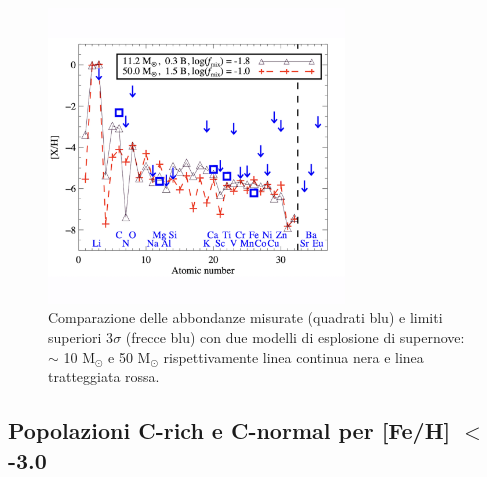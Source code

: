 \documentclass[12pt]{article}
\begin{document}
  \
\begin{figure}[!tbp]
\centering

    \includegraphics[width=0.7\textwidth]{nordlander2}
    \caption{Comparazione delle abbondanze misurate (quadrati blu) e limiti superiori 3$\sigma$ (frecce blu) con due modelli di esplosione di supernove: $\sim$ 10 M$_{\odot}$ e 50 M$_{\odot}$  rispettivamente linea continua nera e linea tratteggiata rossa. 
}
    \label{nordlander2}
 
\end{figure}

\newpage

\subsection{Popolazioni C-rich e C-normal per [Fe/H] $<$ -3.0}

\label{abbondanze1}
\end{document}
